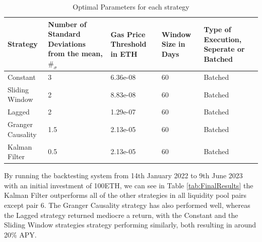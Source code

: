 \begin{table}[H]
    \centering
    \begin{tabular}{|p{6em}|p{8em}|p{6em}|p{4em}|p{8em}|}
    \hline
        Strategy & Number of Standard Deviations from the mean, $\#_{\sigma}$ & Gas Price Threshold in ETH & Window Size in Days & Type of Execution, Seperate or Batched \\ \hline
        Constant & 3 & 6.36e-08 & 60 & Batched \\ \hline
        Sliding Window & 2 & 8.83e-08 & 60 & Batched \\ \hline
        Lagged & 2 & 1.29e-07 & 60 & Batched \\ \hline
        Granger Causality & 1.5 & 2.13e-05 & 60 & Batched \\ \hline
        Kalman Filter & 0.5 & 2.13e-05 & 60 & Batched \\ \hline
    \end{tabular}
    \caption{Optimal Parameters for each strategy \label{tab:OptimParams}}
\end{table}

By running the backtesting system from 14th January 2022 to 9th June 2023 with an initial investment of 100ETH, we can see in Table \ref{tab:FinalResults} the Kalman Filter outperforms all of the other strategies in all liquidity pool pairs except pair 6. The Granger Causality strategy has also performed well, whereas the Lagged strategy returned mediocre a return, with the Constant and the Sliding Window strategies strategy performing similarly, both resulting in around 20\% APY.

